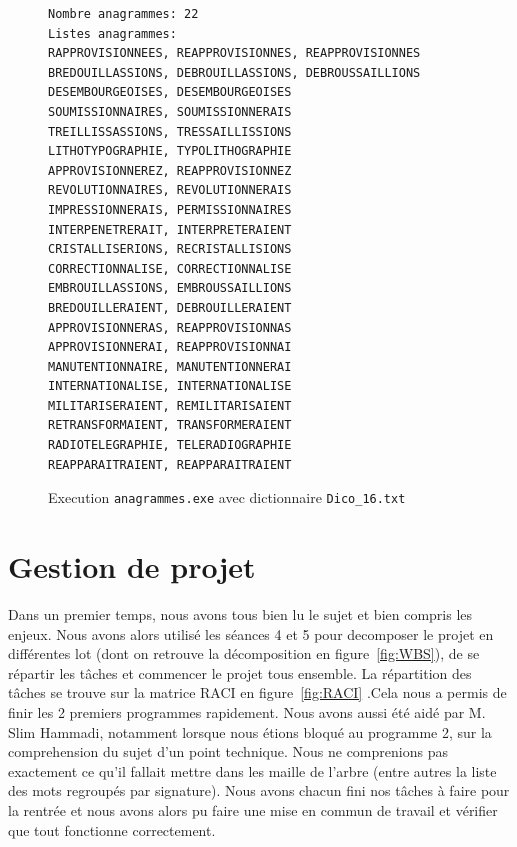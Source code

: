 \documentclass{article} %
\begin{document}
\begin{figure}[H]
  \begin{lstlisting}
Nombre anagrammes: 22
Listes anagrammes:
RAPPROVISIONNEES, REAPPROVISIONNES, REAPPROVISIONNES
BREDOUILLASSIONS, DEBROUILLASSIONS, DEBROUSSAILLIONS
DESEMBOURGEOISES, DESEMBOURGEOISES
SOUMISSIONNAIRES, SOUMISSIONNERAIS
TREILLISSASSIONS, TRESSAILLISSIONS
LITHOTYPOGRAPHIE, TYPOLITHOGRAPHIE
APPROVISIONNEREZ, REAPPROVISIONNEZ
REVOLUTIONNAIRES, REVOLUTIONNERAIS
IMPRESSIONNERAIS, PERMISSIONNAIRES
INTERPENETRERAIT, INTERPRETERAIENT
CRISTALLISERIONS, RECRISTALLISIONS
CORRECTIONNALISE, CORRECTIONNALISE
EMBROUILLASSIONS, EMBROUSSAILLIONS
BREDOUILLERAIENT, DEBROUILLERAIENT
APPROVISIONNERAS, REAPPROVISIONNAS
APPROVISIONNERAI, REAPPROVISIONNAI
MANUTENTIONNAIRE, MANUTENTIONNERAI
INTERNATIONALISE, INTERNATIONALISE
MILITARISERAIENT, REMILITARISAIENT
RETRANSFORMAIENT, TRANSFORMERAIENT
RADIOTELEGRAPHIE, TELERADIOGRAPHIE
REAPPARAITRAIENT, REAPPARAITRAIENT\end{lstlisting}
\caption{Execution \texttt{anagrammes.exe} avec dictionnaire \texttt{Dico\_16.txt}}
\label{fig:prog_3_1}
\end{figure}



\section{Gestion de projet} Dans un premier temps, nous avons tous bien lu le sujet et bien compris les enjeux. Nous avons alors utilisé les séances 4 et 5 pour decomposer le projet en différentes lot (dont on retrouve la décomposition en figure~\ref{fig:WBS}), de se répartir les tâches et commencer le projet tous ensemble. La répartition des tâches se trouve sur la matrice RACI en figure~\ref{fig:RACI} .Cela nous a permis de finir les 2 premiers programmes rapidement. Nous avons aussi été aidé par M. Slim Hammadi, notamment lorsque nous étions bloqué au programme 2, sur la comprehension du sujet d’un point technique. Nous ne comprenions pas exactement ce qu’il fallait mettre dans les maille de l'arbre (entre autres la liste des mots regroupés par signature). Nous avons chacun fini nos tâches à faire pour la rentrée et nous avons alors pu faire une mise en commun de travail et vérifier que tout fonctionne correctement.
\end{document}
